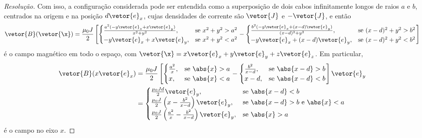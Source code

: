 \begin{proof}[Resolução]
    Com isso, a configuração considerada pode ser entendida como a superposição de dois cabos infinitamente longos de raios \(a\) e \(b\), centrados na origem e na posição \(d\vetor{e}_x\), cujas densidades de corrente são \(\vetor{J}\) e \(-\vetor{J}\), e então
    \begin{equation*}
        \vetor{B}(\vetor{\x}) = \frac{\mu_0J}{2}
        \left[\begin{cases}
                \frac{a^2(- y\vetor{e}_x + x \vetor{e}_y)}{x^2 + y^2},&\text{se }x^2 + y^2 > a^2\\
                - y\vetor{e}_x + x \vetor{e}_y,&\text{se }x^2 + y^2 < a^2
            \end{cases}
        -
        \begin{cases}
                \frac{b^2(- y\vetor{e}_x + (x - d) \vetor{e}_y)}{(x-d)^2 + y^2},&\text{se }(x-d)^2 + y^2 > b^2\\
                - y\vetor{e}_x + (x-d) \vetor{e}_y,&\text{se }(x-d)^2 + y^2 < b^2
            \end{cases}
        \right]
    \end{equation*}
    é o campo magnético em todo o espaço, com \(\vetor{\x} = x\vetor{e}_x + y\vetor{e}_y + z\vetor{e}_z\). Em particular,
    \begin{align*}
        \vetor{B}(x\vetor{e}_x) &= \frac{\mu_0J}{2}
        \left[\begin{cases}
                \frac{a^2 }{x},&\text{se }\abs{x} > a\\
                x,&\text{se }\abs{x} < a
            \end{cases}
        -
        \begin{cases}
                \frac{b^2}{x-d},&\text{se }\abs{x-d}> b\\
                x-d,&\text{se }\abs{x-d}< b
            \end{cases}
        \right]\vetor{e}_y\\
                                &= \begin{cases}
                                    \frac{\mu_0Jd}{2}\vetor{e}_y,&\text{se }\abs{x - d} < b\\
                                    \frac{\mu_0J}{2}\left(x - \frac{b^2}{x - d}\right)\vetor{e}_y,&\text{se }\abs{x - d} > b\text{ e }\abs{x} < a\\
                                    \frac{\mu_0J}{2}\left(\frac{a^2}{x} - \frac{b^2}{x - d}\right)\vetor{e}_y,&\text{se }\abs{x} > a
                                \end{cases}
    \end{align*}
    é o campo no eixo \(x\).
\end{proof}
